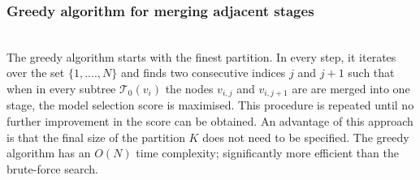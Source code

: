 \documentclass[runningheads]{llncs}
\begin{document}
\subsubsection{Greedy algorithm for merging adjacent stages}
\hfill\\
The greedy algorithm starts with the finest partition. In every step, it iterates over the set $\{1, ...., N\}$ and finds two consecutive indices $j$ and $j+1$ such that when in every subtree $\mathcal{T}_0(v_i)$ the nodes $v_{i, j}$ and $v_{i, j+1}$ are are merged into one stage, the model selection score is maximised. This procedure is repeated until no further improvement in the score can be obtained. An advantage of this approach is that the final size of the partition $K$ does not need to be specified. The greedy algorithm has an $O(N)$ time complexity; significantly more efficient than the brute-force search.
\end{document}
